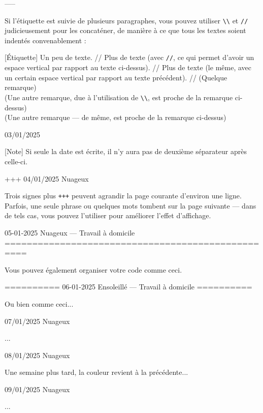 \documentclass[11pt, paperstyle=light yellow, color entry, day-month-year,
  title in boldface, title in sffamily, use style = classical]{jwjournal}
\begin{document}
  -----

  Si l'étiquette est suivie de plusieurs paragraphes, vous pouvez utiliser \texttt{\textbackslash\textbackslash} et \texttt{\slash\slash} judicieusement pour les concaténer, de manière à ce que tous les textes soient indentés convenablement :

  [Étiquette] Un peu de texte.
    //
    Plus de texte (avec \texttt{\slash\slash}, ce qui permet d'avoir un espace vertical par rapport au texte ci-dessus).
    //
    Plus de texte (le même, avec un certain espace vertical par rapport au texte précédent).
    //
    (Quelque remarque)
    \\
    (Une autre remarque, due à l'utilisation de \texttt{\textbackslash\textbackslash}, est proche de la remarque ci-dessus)
    \\
    (Une autre remarque --- de même, est proche de la remarque ci-dessus)



03/01/2025

  [Note] Si seule la date est écrite, il n'y aura pas de deuxième séparateur après celle-ci.


+++
04/01/2025  Nuageux

  Trois signes plus \texttt{+++} peuvent agrandir la page courante d'environ une ligne. Parfois, une seule phrase ou quelques mots tombent sur la page suivante --- dans de tels cas, vous pouvez l'utiliser pour améliorer l'effet d'affichage.



05-01-2025    Nuageux       --- Travail à domicile
==================================================

Vous pouvez également organiser votre code comme ceci.


==========
06-01-2025    Ensoleillé    --- Travail à domicile
==========

Ou bien comme ceci...



07/01/2025  Nuageux

  ...



08/01/2025  Nuageux

  Une semaine plus tard, la couleur revient à la précédente...



09/01/2025  Nuageux

  ...
\end{document}
